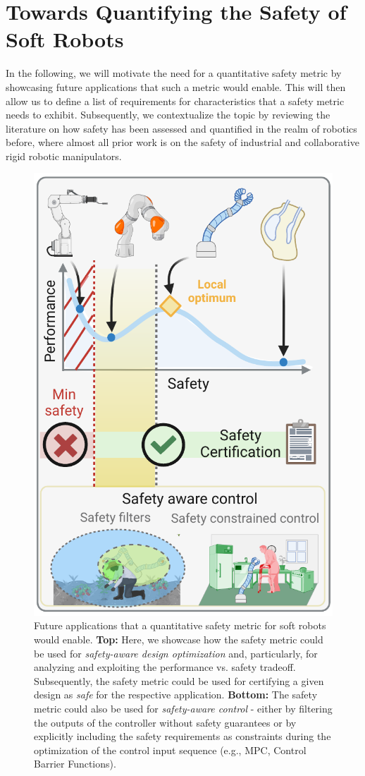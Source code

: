 \section{Towards Quantifying the Safety of Soft Robots}
In the following, we will motivate the need for a quantitative safety metric by showcasing future applications that such a metric would enable.
This will then allow us to define a list of requirements for characteristics that a safety metric needs to exhibit.
Subsequently, we contextualize the topic by reviewing the literature on how safety has been assessed and quantified in the realm of robotics before, where almost all prior work is on the safety of industrial and collaborative rigid robotic manipulators.

\begin{figure}
    \centering
    \includegraphics[width=0.5\linewidth]{safetymetric/figures/safety_metric_applications.pdf}
    \caption{Future applications that a quantitative safety metric for soft robots would enable. \textbf{Top:} Here, we showcase how the safety metric could be used for \emph{safety-aware design optimization} and, particularly, for analyzing and exploiting the performance vs. safety tradeoff. Subsequently, the safety metric could be used for certifying a given design as \emph{safe} for the respective application. \textbf{Bottom:} The safety metric could also be used for \emph{safety-aware control} - either by filtering the outputs of the controller without safety guarantees or by explicitly including the safety requirements as constraints during the optimization of the control input sequence (e.g., MPC, Control Barrier Functions).}
    \label{fig:safetymetric:safety_metric_applications}
\end{figure}

